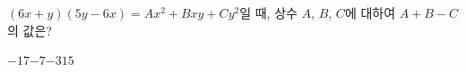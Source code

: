 $(6x+y)(5y-6x)=Ax^2+Bxy+Cy^2$일 때, 상수 $A$, $B$, $C$에 대하여 $A+B-C$의 값은?
\begin{choices32}{$-17$}{$-7$}{$-3$}{$1$}{$5$}\end{choices32}
